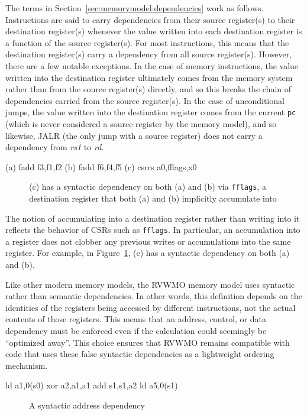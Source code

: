 The terms in Section~\ref{sec:memorymodel:dependencies} work as follows.
Instructions are said to carry dependencies from their source register(s) to their destination register(s) whenever the value written into each destination register is a function of the source register(s).
For most instructions, this means that the destination register(s) carry a dependency from all source register(s).
However, there are a few notable exceptions.
In the case of memory instructions, the value written into the destination register ultimately comes from the memory system rather than from the source register(s) directly, and so this breaks the chain of dependencies carried from the source register(s).
In the case of unconditional jumps, the value written into the destination register comes from the current {\tt pc} (which is never considered a source register by the memory model), and so likewise, JALR (the only jump with a source register) does not carry a dependency from {\em rs1} to {\em rd}.

\begin{verbbox}
(a) fadd  f3,f1,f2
(b) fadd  f6,f4,f5
(c) csrrs a0,fflags,x0
\end{verbbox}
\begin{figure}[h!]
  \centering\small
  \theverbbox
  \caption{(c) has a syntactic dependency on both (a) and (b) via {\tt fflags}, a destination register that both (a) and (b) implicitly accumulate into}
  \label{fig:litmus:fflags}
\end{figure}

The notion of accumulating into a destination register rather than writing into it reflects the behavior of CSRs such as {\tt fflags}.
In particular, an accumulation into a register does not clobber any previous writes or accumulations into the same register.
For example, in Figure~\ref{fig:litmus:fflags}, (c) has a syntactic dependency on both (a) and (b).

Like other modern memory models, the RVWMO memory model uses syntactic rather than semantic dependencies.
In other words, this definition depends on the identities of the
registers being accessed by different instructions, not the actual
contents of those registers.  This means that an address, control, or
data dependency must be enforced even if the calculation could seemingly
be ``optimized away''.
This choice ensures that RVWMO remains compatible with code that uses these false syntactic dependencies as a lightweight ordering mechanism.

\begin{verbbox}
ld  a1,0(s0)
xor a2,a1,a1
add s1,s1,a2
ld  a5,0(s1)
\end{verbbox}
\begin{figure}[h!]
  \centering\small
  \theverbbox
  \caption{A syntactic address dependency}
  \label{fig:litmus:address}
\end{figure}

